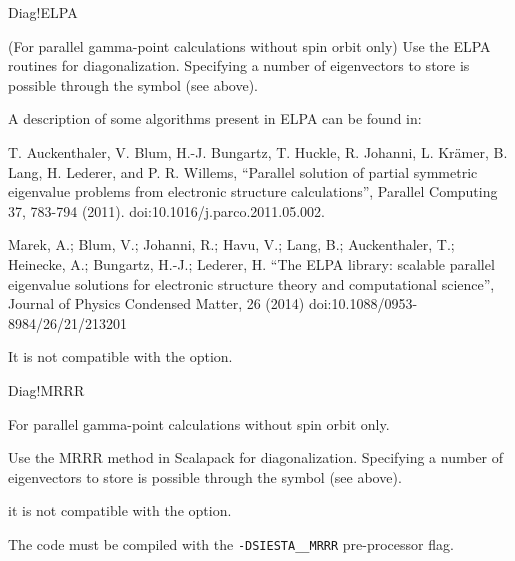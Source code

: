 \begin{fdflogicalF}{Diag!ELPA}

  (For parallel gamma-point calculations without spin orbit only) Use
  the ELPA routines for diagonalization.  Specifying a number of
  eigenvectors to store is possible through the symbol
   (see above).

  A description of some algorithms present in ELPA can be found in:

  T. Auckenthaler, V. Blum, H.-J. Bungartz, T. Huckle, R. Johanni,
  L. Kr\"amer, B. Lang, H. Lederer, and P. R. Willems, ``Parallel
  solution of partial symmetric eigenvalue problems from electronic
  structure calculations'', Parallel Computing 37, 783-794 (2011).
  doi:10.1016/j.parco.2011.05.002.

  Marek, A.; Blum, V.; Johanni, R.; Havu, V.; Lang, B.; Auckenthaler,
  T.; Heinecke, A.; Bungartz, H.-J.; Lederer, H.  ``The ELPA library:
  scalable parallel eigenvalue solutions for electronic structure
  theory and computational science'', Journal of Physics Condensed
  Matter, 26 (2014) doi:10.1088/0953-8984/26/21/213201

  \note It is not compatible with the 
  option.
  
\end{fdflogicalF}

\begin{fdflogicalF}{Diag!MRRR}

  For parallel gamma-point calculations without spin orbit only.

  Use the MRRR method in Scalapack for diagonalization. Specifying a
  number of eigenvectors to store is possible through the symbol
   (see above).

  \note it is not compatible with the 
  option.

  \note The code must be compiled with the \texttt{-DSIESTA\_\_MRRR}
  pre-processor flag.
\end{fdflogicalF}


